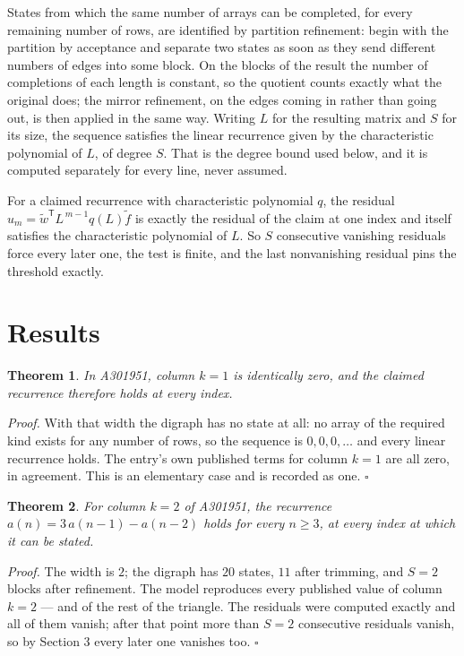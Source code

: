 \documentclass[11pt]{article}
\newtheorem{theorem}{Theorem}
\theoremstyle{definition}
\begin{document}
States from which the same number of arrays can be completed, for every remaining number of rows, are identified by partition refinement: begin with the partition by acceptance and separate two states as soon as they send different numbers of edges into some block. On the blocks of the result the number of completions of each length is constant, so the quotient counts exactly what the original does; the mirror refinement, on the edges coming in rather than going out, is then applied in the same way. Writing $L$ for the resulting matrix and $S$ for its size, the sequence satisfies the linear recurrence given by the characteristic polynomial of $L$, of degree $S$. That is the degree bound used below, and it is computed separately for every line, never assumed.

For a claimed recurrence with characteristic polynomial $q$, the residual $u_m = \tilde w^{\mathsf T}L^{\,m-1}q(L)\tilde f$ is exactly the residual of the claim at one index and itself satisfies the characteristic polynomial of $L$. So $S$ consecutive vanishing residuals force every later one, the test is finite, and the last nonvanishing residual pins the threshold exactly.

\section{Results}

\begin{theorem} In A301951, column $k = 1$ is identically zero, and the claimed recurrence therefore holds at every index.\end{theorem}

{\itshape Proof.} With that width the digraph has no state at all: no array of the required kind exists for any number of rows, so the sequence is $0,0,0,\dots$ and every linear recurrence holds. The entry's own published terms for column $k = 1$ are all zero, in agreement. This is an elementary case and is recorded as one. $\square$

\begin{theorem} For column $k = 2$ of A301951, the recurrence $a(n) = 3\,a(n-1) - a(n-2)$ holds for every $n \ge 3$, at every index at which it can be stated.\end{theorem}

{\itshape Proof.} The width is $2$; the digraph has $20$ states, $11$ after trimming, and $S = 2$ blocks after refinement. The model reproduces every published value of column $k = 2$ --- and of the rest of the triangle. The residuals were computed exactly and all of them vanish; after that point more than $S = 2$ consecutive residuals vanish, so by Section 3 every later one vanishes too. $\square$
\end{document}
